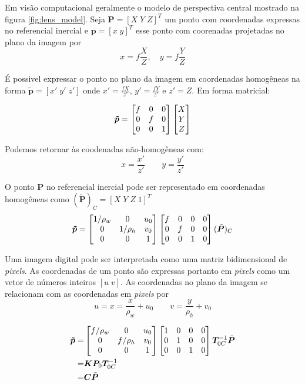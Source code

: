 Em visão computacional geralmente o modelo de perspectiva central mostrado na figura \ref{fig:lens_model}.
Seja $\bm{P} = [X\; Y\; Z]^T$ um ponto com coordenadas expressas no referencial inercial e $\bm{p} = [x\;y]^T$ esse ponto com coorenadas projetadas no plano da imagem por
\begin{equation}
x = f \frac{X}{Z}, \quad y = f \frac{Y}{Z}
\end{equation}

É possivel expressar o ponto no plano da imagem em coordenadas homogêneas na forma $\tilde{\bm{p}} = [x'\; y' \; z']$ onde $x' = \frac{fX}{z'}$, $y' = \frac{fY}{z'}$ e $z' = Z$. Em forma matricial:

\begin{equation}
\bm{\tilde{p}} = 
\begin{bmatrix} f & 0 & 0 \\
	 0 & f & 0 \\
	 0 & 0 & 1	
\end{bmatrix}
\begin{bmatrix}X\\Y\\Z\end{bmatrix}
\end{equation}

Podemos retornar às coodenadas não-homogêneas com:
\[ x = \frac{x'}{z'} \qquad y = \frac{y'}{z'}\]

O ponto $\bm{P}$ no referencial inercial pode ser representado em coordenadas homogêneas como $(\bm{\tilde{P}})_C = [X \; Y \; Z \; 1]^T$
\begin{equation}
\bm{\tilde{p}} = 
\begin{bmatrix}
	1/\rho_w & 0 & u_0 \\
	0        & 1/\rho_h &v_0 \\
	0 & 0 & 1 \\
\end{bmatrix}
\begin{bmatrix} f & 0 & 0 & 0\\
	 0 & f & 0 & 0\\
	 0 & 0 & 1 & 0	
\end{bmatrix}
(\tilde{\bm{P}})_C
\end{equation}

Uma imagem digital pode ser interpretada como uma matriz bidimensional de \textit{pixels}. As coordenadas de um ponto são expressas portanto em \textit{pixels} como um vetor de números inteiros $[u\; v]$. As coordenadas no plano da imagem se relacionam com as coordenadas em \textit{pixels} por
\begin{equation}
u = x = \frac{x}{\rho_w} + u_0 \qquad v = \frac{y}{\rho_h} + v_0
\end{equation}


\begin{align}\label{eq:camera_projection}
\bm{\tilde{p}} =& 
\begin{bmatrix}
	f/\rho_w & 0 & u_0 \\
	0        & f/\rho_h &v_0 \\
	0 & 0 & 1 \\
\end{bmatrix}
\begin{bmatrix}  1 & 0 & 0 & 0\\
	 0 & 1 & 0 & 0\\
	 0 & 0 & 1 & 0	
\end{bmatrix}
\bm{T}_{0C}^{-1}\tilde{\bm{P}}\\
=& \bm{K} \bm{P}_0 \bm{T}_{0C}^{-1} \\ 
=& \bm{C} \bm{\tilde{P}}
\end{align}


